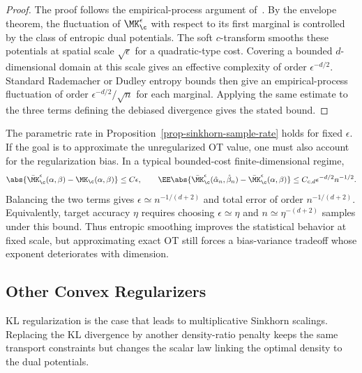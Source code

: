 \begin{proof}
	The proof follows the empirical-process argument of~\cite{genevay2018sample}. By the envelope theorem, the fluctuation of $\MK_\c^\epsilon$ with respect to its first marginal is controlled by the class of entropic dual potentials. The soft $c$-transform smooths these potentials at spatial scale $\sqrt\epsilon$ for a quadratic-type cost. Covering a bounded $d$-dimensional domain at this scale gives an effective complexity of order $\epsilon^{-d/2}$. Standard Rademacher or Dudley entropy bounds then give an empirical-process fluctuation of order $\epsilon^{-d/2}/\sqrt n$ for each marginal. Applying the same estimate to the three terms defining the debiased divergence gives the stated bound.
\end{proof}

\begin{rem}\label{rem-sinkhorn-no-free-lunch}
	The parametric rate in Proposition~\ref{prop-sinkhorn-sample-rate} holds for fixed $\epsilon$. If the goal is to approximate the unregularized OT value, one must also account for the regularization bias. In a typical bounded-cost finite-dimensional regime,
	\[
		\abs{\bar\MK_\c^\epsilon(\alpha,\beta)-\MK_\c(\alpha,\beta)}
		\leq C\epsilon,
		\qquad
		\EE\abs{\bar\MK_\c^\epsilon(\hat\alpha_n,\hat\beta_n)-\bar\MK_\c^\epsilon(\alpha,\beta)}
		\leq C_{c,d}\epsilon^{-d/2}n^{-1/2}.
	\]
	Balancing the two terms gives $\epsilon\simeq n^{-1/(d+2)}$ and total error of order $n^{-1/(d+2)}$. Equivalently, target accuracy $\eta$ requires choosing $\epsilon\simeq\eta$ and $n\simeq\eta^{-(d+2)}$ samples under this bound. Thus entropic smoothing improves the statistical behavior at fixed scale, but approximating exact OT still forces a bias-variance tradeoff whose exponent deteriorates with dimension.
\end{rem}


\subsection{Other Convex Regularizers}
\label{sec-sinkhorn-other-regularizers}

KL regularization is the case that leads to multiplicative Sinkhorn scalings. Replacing the KL divergence by another density-ratio penalty keeps the same transport constraints but changes the scalar law linking the optimal density to the dual potentials.


